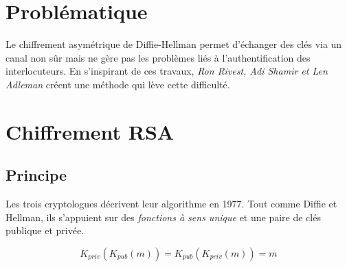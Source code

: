 \documentclass[a4paper,11pt]{article}
\begin{document}
\section{Problématique} 
Le chiffrement asymétrique de Diffie-Hellman permet d'échanger des clés via un canal non sûr mais ne gère pas les problèmes liés à l'authentification des interlocuteurs. En s'inspirant de ces travaux, \emph{Ron Rivest, Adi Shamir et Len Adleman} créent une méthode qui lève cette difficulté.
\begin{center}
\end{center}
\section{Chiffrement RSA}
\subsection{Principe}
Les trois cryptologues décrivent leur algorithme en 1977. Tout comme Diffie et Hellman, ils s'appuient sur des \emph{fonctions à sens unique} et une paire de clés publique et privée.
\begin{aretenir}[]
    {\Large$$K_{priv}(K_{pub}(m))=K_{pub}(K_{priv}(m))=m$$}
\end{aretenir}
\newcommand{\puzzle}[3]{
    \draw[fill=white] (#1-0.6,#2) -- (#1-0.6,0.7+#2) -- (1+#1,0.7+#2) arc (220:-40:0.3) -- (3.1+#1,0.7+#2) -- (3.1+#1,#2) -- cycle;
    \node at(#1+1.25,0.35+#2){#3};
    }
\newcommand{\puzzlebis}[3]{
    \draw (#1-0.6,1.9+#2) -- (#1-0.6,0.7+#2) -- (1+#1,0.7+#2) arc (220:-40:0.3) -- (3.1+#1,0.7+#2) -- (3.1+#1,1.9+#2) -- cycle;
    \node at(#1+1.25,1.55+#2){#3};
    }
\end{document}
